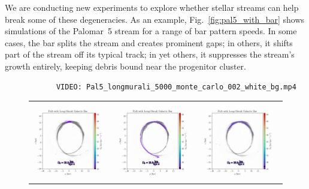         We are conducting new experiments to explore whether stellar streams can help break some of these degeneracies. As an example, Fig.~\ref{fig:pal5_with_bar} shows simulations of the Palomar~5 stream for a range of bar pattern speeds. In some cases, the bar splits the stream and creates prominent gaps; in others, it shifts part of the stream off its typical track; in yet others, it suppresses the stream’s growth entirely, keeping debris bound near the progenitor cluster.  

        \begin{verbatim}
            VIDEO: Pal5_longmurali_5000_monte_carlo_002_white_bg.mp4
        \end{verbatim}

        \begin{figure}
            \centering
            \begin{tabular}{ccc}
                \includegraphics[width=.32\linewidth]{images/frame_0002.png}&
                \includegraphics[width=.32\linewidth]{images/frame_0004.png}&
                \includegraphics[width=.32\linewidth]{images/frame_0008.png}\\
                

\end{tabular}
\end{figure}
